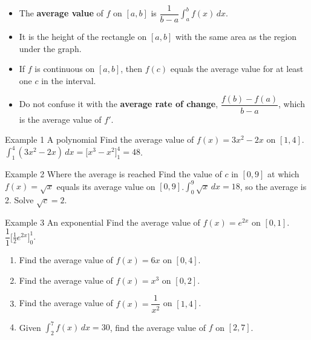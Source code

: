 \documentclass[11pt]{article}
\begin{document}

\begin{ideabox}
\begin{itemize}[leftmargin=*,itemsep=2pt,topsep=2pt]
  \item The \textbf{average value} of $f$ on $[a,b]$ is $\dfrac{1}{b-a}\displaystyle\int_{a}^{b}f(x)\,dx$.
  \item It is the height of the rectangle on $[a,b]$ with the same area as the region under the graph.
  \item If $f$ is continuous on $[a,b]$, then $f(c)$ equals the average value for at least one $c$ in the interval.
  \item Do not confuse it with the \textbf{average rate of change}, $\dfrac{f(b)-f(a)}{b-a}$, which is the average value of $f'$.
\end{itemize}
\end{ideabox}

\begin{example}{Example 1 \textperiodcentered{} A polynomial}
Find the average value of $f(x)=3x^2-2x$ on $[1,4]$.\soln $\displaystyle\int_{1}^{4}(3x^2-2x)\,dx=\Big[x^3-x^2\Big]_1^4=48$.
\end{example}

\begin{example}{Example 2 \textperiodcentered{} Where the average is reached}
Find the value of $c$ in $[0,9]$ at which $f(x)=\sqrt{x}$ equals its average value on $[0,9]$.\soln $\displaystyle\int_{0}^{9}\sqrt x\,dx=18$, so the average is 2. Solve $\sqrt c=2$.
\end{example}

\begin{example}{Example 3 \textperiodcentered{} An exponential}
Find the average value of $f(x)=e^{2x}$ on $[0,1]$.\soln $\dfrac{1}{1}\Big[\tfrac12e^{2x}\Big]_0^1$.
\end{example}

\newpage
{}

\begin{enumerate}[leftmargin=*,itemsep=2pt]
  \item Find the average value of $f(x)=6x$ on $[0,4]$.\work{2.3cm}
  \item Find the average value of $f(x)=x^3$ on $[0,2]$.\work{2.3cm}
  \item Find the average value of $f(x)=\dfrac{1}{x^2}$ on $[1,4]$.\work{2.3cm}
  \item Given $\displaystyle\int_{2}^{7}f(x)\,dx=30$, find the average value of $f$ on $[2,7]$.\work{2.3cm}
\end{enumerate}
\end{document}
